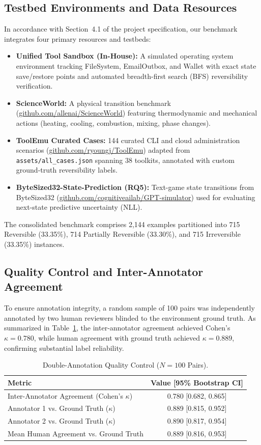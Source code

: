 \documentclass[10pt,twocolumn,letterpaper]{article}
\begin{document}
\subsection{Testbed Environments and Data Resources}
In accordance with Section~4.1 of the project specification, our benchmark integrates four primary resources and testbeds:
\begin{itemize}
    \item \textbf{Unified Tool Sandbox (In-House):} A simulated operating system environment tracking FileSystem, EmailOutbox, and Wallet with exact state save/restore points and automated breadth-first search (BFS) reversibility verification.
    \item \textbf{ScienceWorld:} A physical transition benchmark (\url{github.com/allenai/ScienceWorld}) \cite{wang2024can} featuring thermodynamic and mechanical actions (heating, cooling, combustion, mixing, phase changes).
    \item \textbf{ToolEmu Curated Cases:} 144 curated CLI and cloud administration scenarios (\url{github.com/ryoungj/ToolEmu}) \cite{ruan2024identifying} adapted from \texttt{assets/all\_cases.json} spanning 38 toolkits, annotated with custom ground-truth reversibility labels.
    \item \textbf{ByteSized32-State-Prediction (RQ5):} Text-game state transitions from ByteSized32 (\url{github.com/cognitiveailab/GPT-simulator}) used for evaluating next-state predictive uncertainty (NLL).
\end{itemize}
The consolidated benchmark comprises 2,144 examples partitioned into 715 Reversible (33.35\%), 714 Partially Reversible (33.30\%), and 715 Irreversible (33.35\%) instances.


\subsection{Quality Control and Inter-Annotator Agreement}
To ensure annotation integrity, a random sample of 100 pairs was independently annotated by two human reviewers blinded to the environment ground truth. As summarized in Table~\ref{tab:qc}, the inter-annotator agreement achieved Cohen's $\kappa = 0.780$, while human agreement with ground truth achieved $\kappa = 0.889$, confirming substantial label reliability.

\begin{table}[t]
\centering
\small
\caption{Double-Annotation Quality Control ($N=100$ Pairs).}
\begin{tabular}{lc}
\toprule
Metric & Value [95\% Bootstrap CI] \\
\midrule
Inter-Annotator Agreement (Cohen's $\kappa$) & 0.780 [0.682, 0.865] \\
Annotator 1 vs. Ground Truth ($\kappa$) & 0.889 [0.815, 0.952] \\
Annotator 2 vs. Ground Truth ($\kappa$) & 0.890 [0.817, 0.954] \\
Mean Human Agreement vs. Ground Truth & 0.889 [0.816, 0.953] \\
\bottomrule
\end{tabular}
\label{tab:qc}
\end{table}
\end{document}
